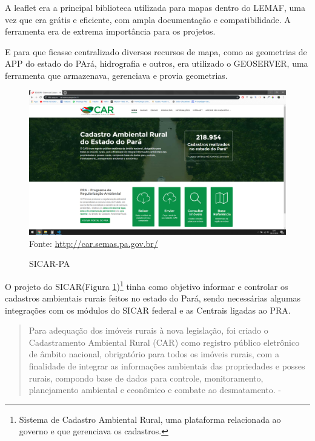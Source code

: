 A leaflet era a principal biblioteca utilizada para mapas dentro do LEMAF, uma vez que era grátis e eficiente, com ampla documentação e compatibilidade. A ferramenta era de extrema importância para os projetos.

E para que ficasse centralizado diversos recursos de mapa, como as geometrias de APP do estado do PArá, hidrografia e outros, era utilizado o GEOSERVER, uma ferramenta que armazenava, gerenciava e provia geometrias.

\begin{figure}[H]
\centering
\caption{SICAR-PA} %
\includegraphics[scale=0.3]{SICAR}\\  %
{\small Fonte: \url{http://car.semas.pa.gov.br/}} %
\label{fig:sicar} %
\end{figure}

O projeto do SICAR(Figura \ref{fig:sicar})\footnote{Sistema de Cadastro Ambiental Rural, uma plataforma relacionada ao governo e que gerenciava os cadastros.} tinha como objetivo informar e controlar os cadastros ambientais rurais feitos no estado do Pará, sendo necessárias algumas integrações com os módulos do SICAR federal e as Centrais ligadas ao PRA.

\begin{quote}
    Para adequação dos imóveis rurais à nova legislação, foi criado o Cadastramento
Ambiental Rural (CAR) como registro público eletrônico de âmbito nacional,
obrigatório para todos os imóveis rurais, com a finalidade de integrar as informações ambientais das propriedades e posses rurais, compondo base de dados
para controle, monitoramento, planejamento ambiental e econômico e combate
ao desmatamento. - \cite{de2015cadastro}
\end{quote}

